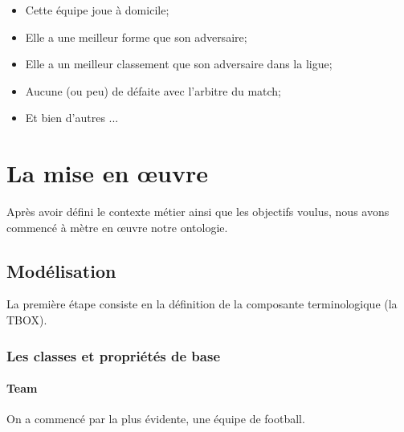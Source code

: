 \documentclass[oneside,13pt,a4paper]{article}
\begin{document}
\begin{itemize}
  \item Cette équipe joue à domicile;
  \item Elle a une meilleur forme que son adversaire;
  \item Elle a un meilleur classement que son adversaire dans la ligue;
  \item Aucune (ou peu) de défaite avec l'arbitre du match;
  \item Et bien d'autres ...
\end{itemize}

\section{La mise en œuvre}

Après avoir défini le contexte métier ainsi que les objectifs voulus, nous avons commencé à mètre en œuvre notre ontologie.

\subsection{Modélisation}

La première étape consiste en la définition de la composante terminologique (la TBOX).

\subsubsection{Les classes et propriétés de base}

\paragraph{Team}

On a commencé par la plus évidente, une équipe de football.
\end{document}
